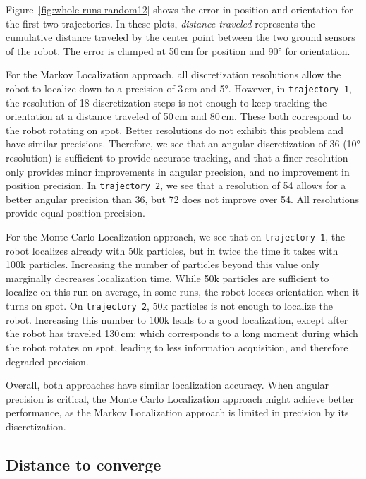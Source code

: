 \documentclass[letterpaper, 10pt, conference]{ieeeconf}
\newcommand{\Fig}[1]{Figure~\ref{fig:#1}}
\begin{document}
\Fig{whole-runs-random12} shows the error in position and orientation for the first two trajectories.
In these plots, \emph{distance traveled} represents the cumulative distance traveled by the center point between the two ground sensors of the robot.
The error is clamped at 50\,cm for position and 90° for orientation.

For the Markov Localization approach, all discretization resolutions allow the robot to localize down to a precision of 3\,cm and 5°.
However, in \texttt{trajectory~1}, the resolution of 18 discretization steps is not enough to keep tracking the orientation at a distance traveled of 50\,cm and 80\,cm.
These both correspond to the robot rotating on spot.
Better resolutions do not exhibit this problem and have similar precisions.
Therefore, we see that an angular discretization of 36 (10° resolution) is sufficient to provide accurate tracking, and that a finer resolution only provides minor improvements in angular precision, and no improvement in position precision.
In \texttt{trajectory~2}, we see that a resolution of 54 allows for a better angular precision than 36, but 72 does not improve over 54.
All resolutions provide equal position precision.

For the Monte Carlo Localization approach, we see that on \texttt{trajectory~1}, the robot localizes already with 50k particles, but in twice the time it takes with 100k particles.
Increasing the number of particles beyond this value only marginally decreases localization time.
While 50k particles are sufficient to localize on this run on average, in some runs, the robot looses orientation when it turns on spot.
On \texttt{trajectory~2}, 50k particles is not enough to localize the robot.
Increasing this number to 100k leads to a good localization, except after the robot has traveled 130\,cm; which corresponds to a long moment during which the robot rotates on spot, leading to less information acquisition, and therefore degraded precision.

Overall, both approaches have similar localization accuracy.
When angular precision is critical, the Monte Carlo Localization approach might achieve better performance, as the Markov Localization approach is limited in precision by its discretization.

\subsection{Distance to converge}
\end{document}
